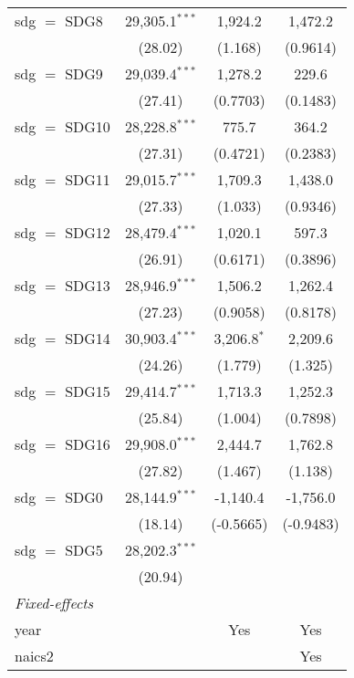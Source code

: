\begin{tabular}{lccc}
   sdg $=$ SDG8  & 29,305.1$^{***}$ & 1,924.2          & 1,472.2\\   
                 & (28.02)          & (1.168)          & (0.9614)\\   
   sdg $=$ SDG9  & 29,039.4$^{***}$ & 1,278.2          & 229.6\\   
                 & (27.41)          & (0.7703)         & (0.1483)\\   
   sdg $=$ SDG10 & 28,228.8$^{***}$ & 775.7            & 364.2\\   
                 & (27.31)          & (0.4721)         & (0.2383)\\   
   sdg $=$ SDG11 & 29,015.7$^{***}$ & 1,709.3          & 1,438.0\\   
                 & (27.33)          & (1.033)          & (0.9346)\\   
   sdg $=$ SDG12 & 28,479.4$^{***}$ & 1,020.1          & 597.3\\   
                 & (26.91)          & (0.6171)         & (0.3896)\\   
   sdg $=$ SDG13 & 28,946.9$^{***}$ & 1,506.2          & 1,262.4\\   
                 & (27.23)          & (0.9058)         & (0.8178)\\   
   sdg $=$ SDG14 & 30,903.4$^{***}$ & 3,206.8$^{*}$    & 2,209.6\\   
                 & (24.26)          & (1.779)          & (1.325)\\   
   sdg $=$ SDG15 & 29,414.7$^{***}$ & 1,713.3          & 1,252.3\\   
                 & (25.84)          & (1.004)          & (0.7898)\\   
   sdg $=$ SDG16 & 29,908.0$^{***}$ & 2,444.7          & 1,762.8\\   
                 & (27.82)          & (1.467)          & (1.138)\\   
   sdg $=$ SDG0  & 28,144.9$^{***}$ & -1,140.4         & -1,756.0\\   
                 & (18.14)          & (-0.5665)        & (-0.9483)\\   
   sdg $=$ SDG5  & 28,202.3$^{***}$ &                  &   \\   
                 & (20.94)          &                  &   \\   
   \midrule
   \emph{Fixed-effects}\\
   year          &                  & Yes              & Yes\\  
   naics2        &                  &                  & Yes\\  

\end{tabular}
